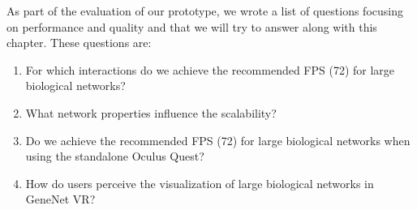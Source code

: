 


As part of the evaluation of our prototype, we wrote a list of questions focusing on performance and quality and that we will try to answer along with this chapter. These questions are:
\begin{enumerate}
  \item For which interactions do we achieve the recommended FPS (72) for large biological networks?
  \item What network properties influence the scalability?
  \item Do we achieve the recommended FPS (72) for large biological networks when using the standalone Oculus Quest?
  \item How do users perceive the visualization of large biological networks in GeneNet VR?
\end{enumerate}

